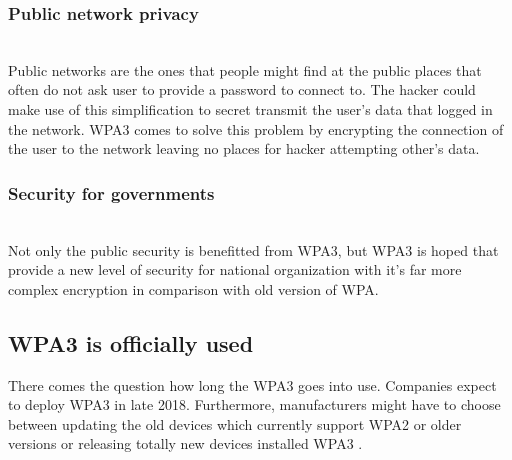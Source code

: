\subsubsection{Public network privacy}~\\
Public networks are the ones that people might find at the public places that often do not ask user to provide a password to connect to. The hacker could make use of this simplification to secret transmit the user’s data that logged in the network.
WPA3 comes to solve this problem by encrypting the connection of the user to the network leaving no places for hacker attempting other’s data.\cite{hoffman_2018} 
\subsubsection{Security for governments}~\\
Not only the public security is benefitted from WPA3, but WPA3  is hoped that provide a new level of security for national organization with it’s far more complex encryption in comparison with old version of WPA.
\subsection{WPA3 is officially used }
There comes the question how long the WPA3 goes into use. Companies expect to deploy WPA3 in late 2018. Furthermore, manufacturers might have to choose between updating the old devices which currently support WPA2 or older versions or releasing totally new devices installed WPA3 \cite{hoffman_2018}.